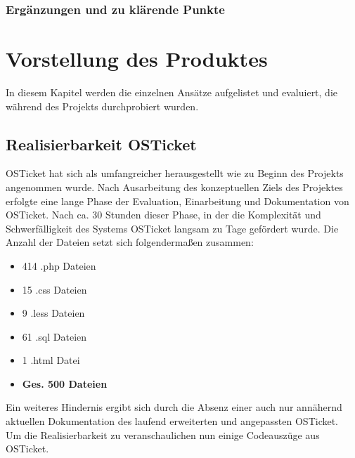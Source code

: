 \subsection{Ergänzungen und zu klärende Punkte}

\chapter{Vorstellung des Produktes}
In diesem Kapitel werden die einzelnen Ansätze aufgelistet und evaluiert, die während des Projekts durchprobiert wurden.
\section{Realisierbarkeit OSTicket}
OSTicket hat sich als umfangreicher herausgestellt wie zu Beginn des Projekts angenommen wurde. Nach Ausarbeitung des konzeptuellen Ziels des Projektes erfolgte eine lange Phase der Evaluation, Einarbeitung und Dokumentation von OSTicket. Nach ca. 30 Stunden dieser Phase, in der die Komplexität und Schwerfälligkeit des Systems OSTicket langsam zu Tage gefördert wurde. Die Anzahl der Dateien setzt sich folgendermaßen zusammen:
\begin{itemize}
	\item 414 .php Dateien
	\item 15 .css Dateien
	\item 9 .less Dateien
	\item 61 .sql Dateien
	\item 1 .html Datei
	\item \textbf{Ges. 500 Dateien}
\end{itemize}

Ein weiteres Hindernis ergibt sich durch die Absenz einer auch nur annähernd aktuellen Dokumentation des laufend erweiterten und angepassten OSTicket.
\\
Um die Realisierbarkeit zu veranschaulichen nun einige Codeauszüge aus OSTicket.
